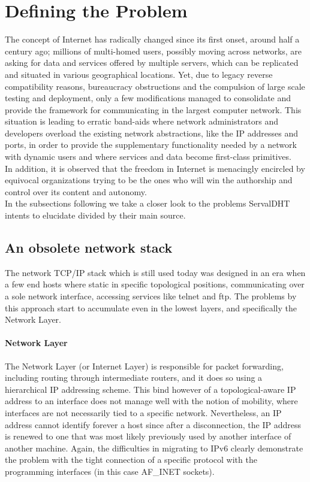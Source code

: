 \documentclass[12pt,a4paper,oneside]{article}
\begin{document}
\section{Defining the Problem}
\label{problemdefinition}
The concept of Internet has radically changed since its first onset, around half a century ago; millions of multi-homed users, possibly moving across networks, are asking for data and services offered by multiple servers, which can be replicated and situated in various geographical locations.
Yet, due to legacy reverse compatibility reasons, bureaucracy obstructions and the compulsion of large scale testing and deployment, only a few modifications managed to consolidate and provide the framework for communicating in the largest computer network.
This situation is leading to erratic band-aids where network administrators and developers overload the existing network abstractions, like the IP  addresses and ports, in order to provide the supplementary functionality needed by a network with dynamic users and where services and data become first-class primitives.\\
\indent In addition, it is observed that the freedom in Internet is menacingly encircled by equivocal organizations trying to be the ones who will win the authorship and control over its content and autonomy.\\
\indent In the subsections following we take a closer look to the problems ServalDHT intents to elucidate divided by their main source.

\subsection{An obsolete network stack}
The network TCP/IP  stack which is still used today was designed in an era when a few end hosts where static in specific topological positions, communicating over a sole network interface, accessing services like telnet and ftp.
The problems by this approach start to accumulate even in the lowest layers, and specifically the Network Layer.
\paragraph{Network Layer} The Network Layer (or Internet Layer) is responsible for packet forwarding, including routing through intermediate routers, and it does so using a hierarchical IP addressing scheme.
This bind however of a topological-aware IP address to an interface does not manage well with the notion of mobility, where interfaces are not necessarily tied to a specific network.
Nevertheless, an IP address cannot identify forever a host since after a disconnection, the IP address is renewed to one that was most likely previously used by another interface of another machine.
Again, the difficulties in migrating to IPv6 clearly demonstrate the problem with the tight connection of a specific protocol with the programming interfaces (in this case AF\_INET sockets).
\pagebreak
\end{document}
